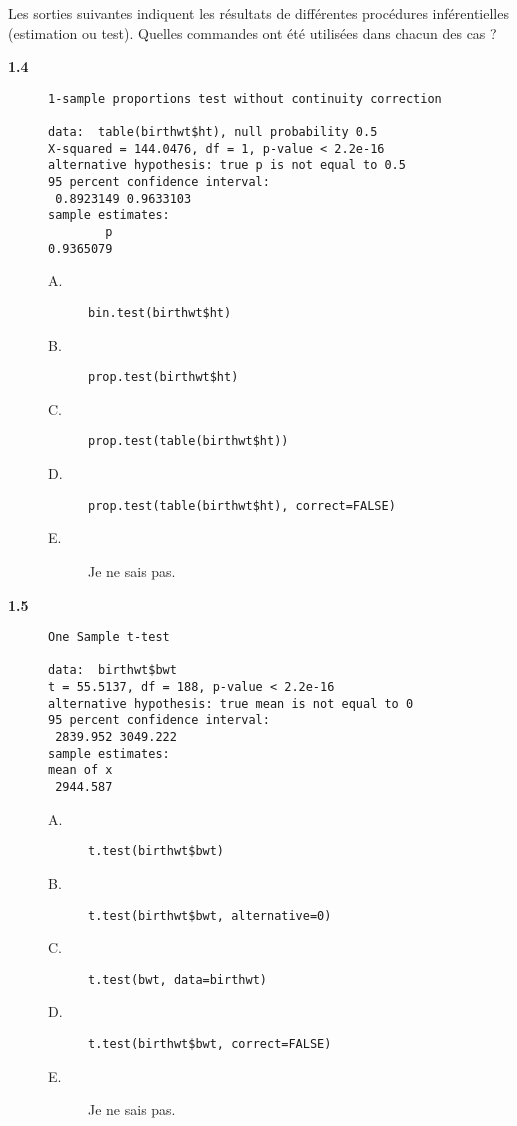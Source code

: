 \documentclass[11pt]{report}
\theoremstyle{definition}
\begin{document}
Les sorties suivantes indiquent les résultats de différentes
procédures inférentielles (estimation ou test). Quelles commandes ont été
utilisées dans chacun des cas ? 
\begin{description}
\item[\bf 1.4] 
\begin{Verbatim}[frame=single]
	1-sample proportions test without continuity correction

data:  table(birthwt$ht), null probability 0.5 
X-squared = 144.0476, df = 1, p-value < 2.2e-16
alternative hypothesis: true p is not equal to 0.5 
95 percent confidence interval:
 0.8923149 0.9633103 
sample estimates:
        p 
0.9365079 
\end{Verbatim}
  \begin{description}
  \item[A.] \verb|bin.test(birthwt$ht)|
  \item[B.] \verb|prop.test(birthwt$ht)|
  \item[C.] \verb|prop.test(table(birthwt$ht))|
  \item[D.] \verb|prop.test(table(birthwt$ht), correct=FALSE)|
  \item[E.] Je ne sais pas.
  \end{description}  
\item[\bf 1.5] 
\begin{Verbatim}[frame=single]
  	One Sample t-test

data:  birthwt$bwt 
t = 55.5137, df = 188, p-value < 2.2e-16
alternative hypothesis: true mean is not equal to 0 
95 percent confidence interval:
 2839.952 3049.222 
sample estimates:
mean of x 
 2944.587 
\end{Verbatim}
  \begin{description}
  \item[A.] \verb|t.test(birthwt$bwt)|
  \item[B.] \verb|t.test(birthwt$bwt, alternative=0)|
  \item[C.] \verb|t.test(bwt, data=birthwt)|
  \item[D.] \verb|t.test(birthwt$bwt, correct=FALSE)|
  \item[E.] Je ne sais pas.
  \end{description}  
\end{description}
\end{document}
